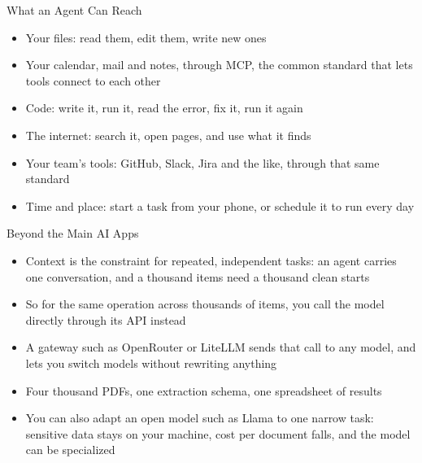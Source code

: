 \documentclass[aspectratio=169]{beamer}
\begin{document}
\begin{frame}{What an Agent Can Reach}
    \begin{itemize}\setlength{\itemsep}{6pt}
        \item Your files: read them, edit them, write new ones
        \item Your calendar, mail and notes, through MCP, the common standard that lets tools
              connect to each other
        \item Code: write it, run it, read the error, fix it, run it again
        \item The internet: search it, open pages, and use what it finds
        \item Your team's tools: GitHub, Slack, Jira and the like, through that same standard
        \item Time and place: start a task from your phone, or schedule it to run every day
    \end{itemize}
\end{frame}

\begin{frame}{Beyond the Main AI Apps}
    \begin{itemize}\setlength{\itemsep}{6pt}
        \item Context is the constraint for repeated, independent tasks: an agent carries one
              conversation, and a thousand items need a thousand clean starts
        \item So for the same operation across thousands of items, you call the model directly
              through its API instead
        \item A gateway such as OpenRouter or LiteLLM sends that call to any model, and lets
              you switch models without rewriting anything
        \item Four thousand PDFs, one extraction schema, one spreadsheet of results
        \item You can also adapt an open model such as Llama to one narrow task: sensitive
              data stays on your machine, cost per document falls, and the model can be
              specialized
    \end{itemize}
\end{frame}
\end{document}
